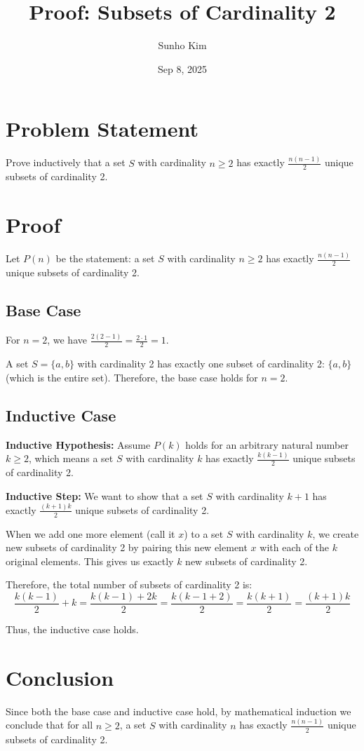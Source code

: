 \documentclass{article}
\title{Proof: Subsets of Cardinality 2}
\author{Sunho Kim}
\date{Sep 8, 2025}
\begin{document}
\maketitle

\section{Problem Statement}
Prove inductively that a set $S$ with cardinality $n \geq 2$ has exactly $\frac{n(n-1)}{2}$ unique subsets of cardinality 2.

\section{Proof}

Let $P(n)$ be the statement: a set $S$ with cardinality $n \geq 2$ has exactly $\frac{n(n-1)}{2}$ unique subsets of cardinality 2.

\subsection{Base Case}
For $n = 2$, we have $\frac{2(2-1)}{2} = \frac{2 \cdot 1}{2} = 1$. 

A set $S = \{a, b\}$ with cardinality 2 has exactly one subset of cardinality 2: $\{a, b\}$ (which is the entire set). Therefore, the base case holds for $n = 2$.

\subsection{Inductive Case}
\textbf{Inductive Hypothesis:} Assume $P(k)$ holds for an arbitrary natural number $k \geq 2$, which means a set $S$ with cardinality $k$ has exactly $\frac{k(k-1)}{2}$ unique subsets of cardinality 2.

\textbf{Inductive Step:} We want to show that a set $S$ with cardinality $k+1$ has exactly $\frac{(k+1)k}{2}$ unique subsets of cardinality 2.

When we add one more element (call it $x$) to a set $S$ with cardinality $k$, we create new subsets of cardinality 2 by pairing this new element $x$ with each of the $k$ original elements. This gives us exactly $k$ new subsets of cardinality 2.

Therefore, the total number of subsets of cardinality 2 is:
$$\frac{k(k-1)}{2} + k = \frac{k(k-1) + 2k}{2} = \frac{k(k-1+2)}{2} = \frac{k(k+1)}{2} = \frac{(k+1)k}{2}$$

Thus, the inductive case holds.

\section{Conclusion}
Since both the base case and inductive case hold, by mathematical induction we conclude that for all $n \geq 2$, a set $S$ with cardinality $n$ has exactly $\frac{n(n-1)}{2}$ unique subsets of cardinality 2.
\end{document}
